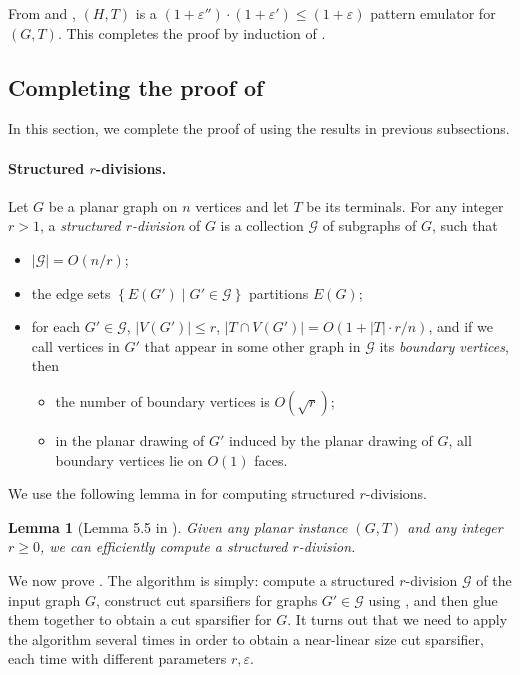 \documentclass[11pt]{article}
\newtheorem{lemma}[theorem]{Lemma}
\theoremstyle{definition}
\newcommand{\set}[1]{\left\{ #1 \right\}}
\newcommand{\gset}{{\mathcal{G}}}
\newcommand{\eps}{{\varepsilon}}
\begin{document}
From  and , $(H,T)$ is a $(1+\eps'')\cdot (1+\eps')\le (1+\eps)$ pattern emulator for $(G,T)$. This completes the proof by induction of .




\subsection{Completing the proof of }

In this section, we complete the proof of  using the results in previous subsections.

\paragraph{Structured $r$-divisions.} Let $G$ be a planar graph on $n$ vertices and let $T$ be its terminals. For any integer $r>1$, a \emph{structured $r$-division} of $G$ is a collection $\gset$ of subgraphs of $G$, such that
\begin{itemize}
\item $|\gset|=O(n/r)$;
\item the edge sets $\set{E(G')\mid G'\in \gset}$ partitions $E(G)$;
\item for each $G'\in \gset$, $|V(G')|\le r$, $|T\cap V(G')|=O(1+|T|\cdot r/n)$, and if we call vertices in $G'$ that appear in some other graph in $\gset$ its \emph{boundary vertices}, then
\begin{itemize}
\item the number of boundary vertices is $O(\sqrt{r})$;
\item in the planar drawing of $G'$ induced by the planar drawing of $G$, all boundary vertices lie on $O(1)$ faces.
\end{itemize}
\end{itemize}

We use the following lemma in \cite{chang2022near} for computing structured $r$-divisions.

\begin{lemma}[Lemma 5.5 in \cite{chang2022near}]
\label{lem: r-division}
Given any planar instance $(G,T)$ and any integer $r\ge 0$, we can efficiently compute a structured $r$-division.
\end{lemma}

We now prove . The algorithm is simply: compute a structured $r$-division $\gset$ of the input graph $G$, construct cut sparsifiers for graphs $G'\in \gset$ using , and then glue them together to obtain a cut sparsifier for $G$.
It turns out that we need to apply the algorithm several times in order to obtain a near-linear size cut sparsifier, each time with different parameters $r,\eps$.
\end{document}
